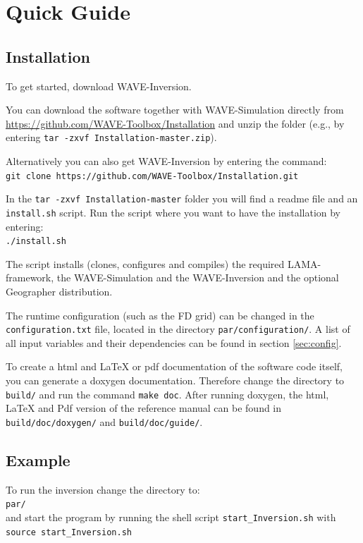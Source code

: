\documentclass[pdftex,a4paper,parskip,listof=totoc,bibliography=totoc,onehalfspacing,12pt]{scrreprt}
\newcommand{\shellcmd}[1]{\indent\indent\texttt{#1}}	%
\newcommand{\shellcmdline}[1]{\indent\indent\texttt{\quad#1}} 	%
\begin{document}
\section{Quick Guide}


\subsection{Installation}
To get started, download WAVE-Inversion. 

You can download the software together with WAVE-Simulation directly from \url{https://github.com/WAVE-Toolbox/Installation} and unzip the folder (e.g., by entering \shellcmd{tar -zxvf Installation-master.zip}).

Alternatively you can also get WAVE-Inversion by entering the command: \\\shellcmdline{git clone https://github.com/WAVE-Toolbox/Installation.git}

In the \shellcmd{tar -zxvf Installation-master} folder you will find a readme file and an \shellcmd{install.sh} script. Run the script where you want to have the installation by entering: \\\shellcmdline{./install.sh}

The script installs (clones, configures and compiles) the required LAMA-framework, the WAVE-Simulation and the WAVE-Inversion and the optional Geographer distribution.

The runtime configuration (such as the FD grid) can be changed in the \shellcmd{configuration.txt} file, located in the directory \shellcmd{par/configuration/}. A list of all input variables and their dependencies can be found in section \ref{sec:config}. 

To create a html and LaTeX or pdf documentation of the software code itself, you can generate a doxygen documentation. Therefore change the directory to \shellcmd{build/} and run the command \shellcmd{make doc}. After running doxygen, the html, LaTeX and Pdf version of the reference manual can be found in \shellcmd{build/doc/doxygen/} and \shellcmd{build/doc/guide/}.

\subsection{Example}
To run the inversion change the directory to: \\\shellcmdline{par/}\\
and start the program by running the shell script \shellcmd{start\_Inversion.sh} with  \\\shellcmdline{source start\_Inversion.sh}
\end{document}
